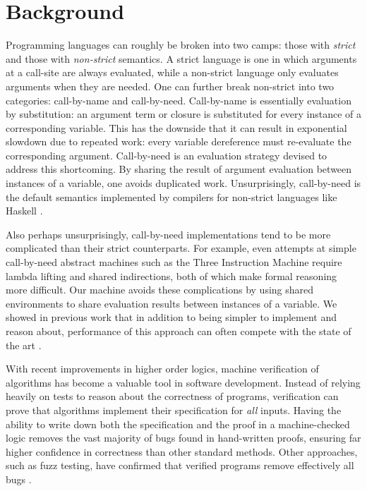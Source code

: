 \section{Background} \label{sec:background}

Programming languages can roughly be broken into two camps: those with
\emph{strict} and those with \emph{non-strict} semantics. A strict language is
one in which arguments at a call-site are always evaluated, while a non-strict
language only evaluates arguments when they are needed. One can further break
non-strict into two categories: call-by-name and call-by-need. Call-by-name is
essentially evaluation by substitution: an argument term or closure is
substituted for every instance of a corresponding variable. This has the
downside that it can result in exponential slowdown due to repeated work: every
variable dereference must re-evaluate the corresponding argument. Call-by-need
is an evaluation strategy devised to address this shortcoming. By sharing the
result of argument evaluation between instances of a variable, one avoids
duplicated work.  Unsurprisingly, call-by-need is the default semantics
implemented by compilers for non-strict languages like Haskell \cite{jonesstg}. 

Also perhaps unsurprisingly, call-by-need implementations tend to be more
complicated than their strict counterparts. For example, even attempts at simple
call-by-need abstract machines such as the Three Instruction Machine \cite{TIM}
require lambda lifting and shared indirections, both of which make formal
reasoning more difficult. Our \ce machine avoids these complications
by using shared environments to share evaluation results between instances of a
variable. We showed in previous work that in addition to being simpler to
implement and reason about, performance of this approach can often compete with
the state of the art \cite{cem}. 

With recent improvements in higher order logics, machine verification of
algorithms has become a valuable tool in software development. Instead of
relying heavily on tests to reason about the correctness of programs,
verification can prove that algorithms implement their specification for
\emph{all} inputs. Having the ability to write down both the specification and
the proof in a machine-checked logic removes the vast majority of bugs found in
hand-written proofs, ensuring far higher confidence in correctness than other
standard methods. Other approaches, such as fuzz testing, have confirmed that
verified programs remove effectively all bugs \cite{yangfuzz}.

